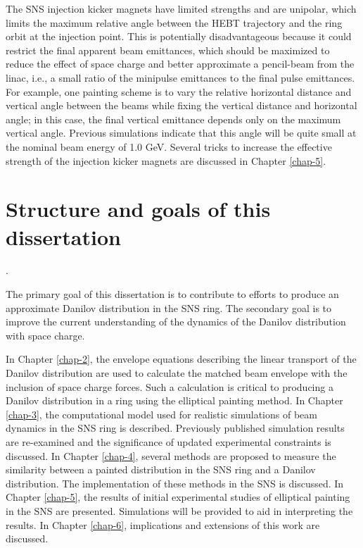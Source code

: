 The SNS injection kicker magnets have limited strengths and are unipolar, which limits the maximum relative angle between the HEBT trajectory and the ring orbit at the injection point. This is potentially disadvantageous because it could restrict the final apparent beam emittances, which should be maximized to reduce the effect of space charge and better approximate a pencil-beam from the linac, i.e., a small ratio of the minipulse emittances to the final pulse emittances. For example, one painting scheme is to vary the relative horizontal distance and vertical angle between the beams while fixing the vertical distance and horizontal angle; in this case, the final vertical emittance depends only on the maximum vertical angle. Previous simulations indicate that this angle will be quite small at the nominal beam energy of 1.0 GeV. Several tricks to increase the effective strength of the injection kicker magnets are discussed in Chapter \ref{chap-5}.


\section{Structure and goals of this dissertation}\label{sec:Goals of this dissertation}.

The primary goal of this dissertation is to contribute to efforts to produce an approximate Danilov distribution in the SNS ring. The secondary goal is to improve the current understanding of the dynamics of the Danilov distribution with space charge.

In Chapter \ref{chap-2}, the envelope equations describing the linear transport of the Danilov distribution are used to calculate the matched beam envelope with the inclusion of space charge forces. Such a calculation is critical to producing a Danilov distribution in a ring using the elliptical painting method. In Chapter \ref{chap-3}, the computational model used for realistic simulations of beam dynamics in the SNS ring is described. Previously published simulation results are re-examined and the significance of updated experimental constraints is discussed. In Chapter \ref{chap-4}, several methods are proposed to measure the similarity between a painted distribution in the SNS ring and a Danilov distribution. The implementation of these methods in the SNS is discussed. In Chapter \ref{chap-5}, the results of initial experimental studies of elliptical painting in the SNS are presented. Simulations will be provided to aid in interpreting the results. In Chapter \ref{chap-6}, implications and extensions of this work are discussed.